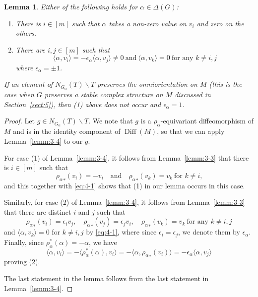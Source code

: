 \documentclass[12pt]{amsart}
\theoremstyle{plain} \numberwithin{equation}{section}
\newtheorem{lemm}[theo]{Lemma}
\theoremstyle{definition}
\def\G0{G^0}
\def\epsilona{\epsilon_\alpha}
\def\RG{\Delta(G)}
\def\G0{G}
\DeclareMathOperator{\Diff}{Diff}
\begin{document}
\begin{lemm} \label{lemm:4-1}
Either of the following holds for $\alpha\in\RG$:
\begin{enumerate}
\item There is $i\in [m]$ such that $\alpha$ takes a non-zero value on $v_i$ and zero on the others. 
\item There are $i, j\in [m]$ such that 
\begin{equation} \label{eq:4-2}
\langle \alpha,v_i\rangle=-\epsilon_\alpha\langle \alpha, v_j\rangle\not=0\ 
\text{and}\ \langle \alpha,v_k\rangle=0 \ \text{for any $k\not=i,j$}
\end{equation}
where $\epsilona=\pm 1$. 
\end{enumerate}
If an element of $N_{\G0_\alpha}(T)\backslash T$ preserves the omniorientation on $M$ (this is the case when $G$ preserves a stable complex structure on $M$ discussed in Section~\ref{sect:5}), then (1) above does not occur and $\epsilona=1$.  
\end{lemm}

\begin{proof}
Let $g\in N_{\G0_\alpha}(T)\backslash T$. We note that $g$ is a $\rho_\alpha$-equivariant diffeomorphism of $M$ and is in the identity component of $\Diff(M)$, so that we can apply Lemma~\ref{lemm:3-4} to our $g$. 

For case (1) of Lemma~\ref{lemm:3-4}, it follows from Lemma~\ref{lemm:3-3} that there is $i\in [m]$ such that 
\begin{equation} \label{eq:4-3}
{\rho_\alpha}_*(v_i)=-v_i\quad\text{and}\quad {\rho_\alpha}_*(v_k)=v_k\ \text{for $k\not=i$,}
\end{equation}
and this together with \eqref{eq:4-1} shows that (1) in our lemma occurs in this case. 

Similarly, for case (2) of Lemma~\ref{lemm:3-4}, it follows from Lemma~\ref{lemm:3-3} that there are distinct $i$ and $j$ such that 
\begin{equation} \label{eq:4-4}
{\rho_\alpha}_*(v_i)=\epsilon_i v_j,\quad {\rho_\alpha}_*(v_j)=\epsilon_j v_i, \quad 
{\rho_\alpha}_*(v_k)=v_k \ \text{for any $k\not=i,j$}
\end{equation}
and $\langle\alpha,v_k\rangle=0$ for $k\not=i,j$ by \eqref{eq:4-1}, where since $\epsilon_i=\epsilon_j$, we denote them by $\epsilona$.  Finally, since $\rho_\alpha^*(\alpha)=-\alpha$, we have
\[
\langle \alpha,v_i\rangle=-\langle \rho_\alpha^*(\alpha),v_i\rangle=-\langle \alpha,
{\rho_\alpha}_*(v_i)\rangle=-\epsilona\langle\alpha,v_j\rangle
\]
proving (2). 

The last statement in the lemma follows from the last statement in Lemma~\ref{lemm:3-4}.  
\end{proof}
\end{document}
